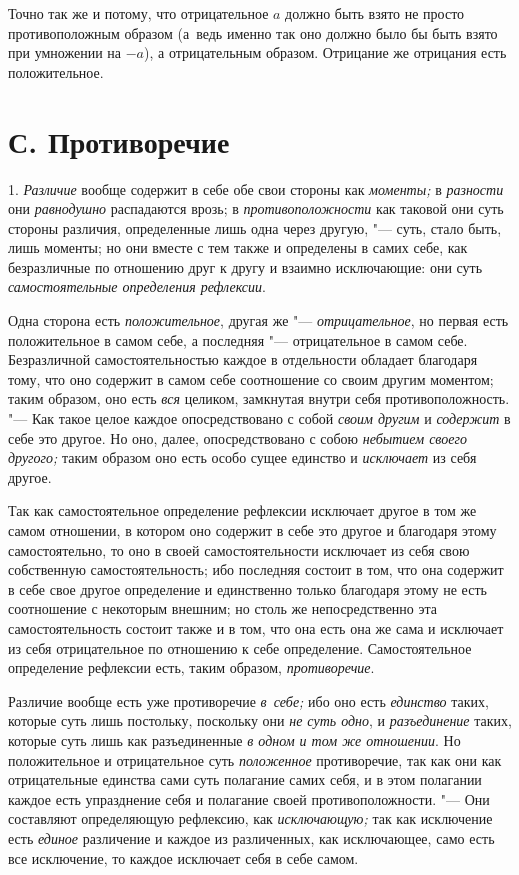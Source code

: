 Точно так же и потому, что отрицательное $a$ должно
быть взято не просто противоположным образом (а~ведь именно так оно должно
было бы быть взято при умножении на $-a$), а
отрицательным образом. Отрицание же отрицания есть положительное.

\section[С. Противоречие]{С. Противоречие}
1. {\em Различие} вообще содержит в себе обе свои стороны
как {\em моменты;} в {\em разности} они {\em равнодушно}
распадаются врозь; в {\em противоположности} как
таковой они суть стороны различия, определенные лишь одна через другую, "---
суть, стало быть, лишь моменты; но они вместе с тем также и определены в
самих себе, как безразличные по отношению друг к другу и взаимно
исключающие: они суть {\em самостоятельные определения рефлексии}.

Одна сторона есть {\em положительное}, другая же
"--- {\em отрицательное}, но первая есть положительное в
самом себе, а последняя "--- отрицательное в самом себе. Безразличной
самостоятельностью каждое в отдельности обладает благодаря тому, что оно
содержит в самом себе соотношение со своим другим моментом; таким образом,
оно есть {\em вся} целиком, замкнутая внутри себя
противоположность. "--- Как такое целое каждое опосредствовано с собой
{\em своим другим} и {\em содержит}
в себе это другое. Но оно, далее, опосредствовано с собою
{\em небытием своего другого;} таким образом оно есть
особо сущее единство и {\em исключает} из себя другое.

Так как самостоятельное определение рефлексии исключает другое в том же
самом отношении, в котором оно содержит в себе это другое и благодаря этому
самостоятельно, то оно в своей самостоятельности исключает из себя свою
собственную самостоятельность; ибо последняя состоит в том, что она
содержит в себе свое другое определение и единственно только благодаря
этому не есть соотношение с некоторым внешним; но столь же непосредственно
эта самостоятельность состоит также и в том, что она есть она же сама и
исключает из себя отрицательное по отношению к себе определение.
Самостоятельное определение рефлексии есть, таким образом, {\em противоречие}.

Различие вообще есть уже противоречие {\em в~себе;} ибо
оно есть {\em единство} таких, которые суть лишь
постольку, поскольку они {\em не суть одно}, и
{\em разъединение} таких, которые суть лишь как
разъединенные {\em в одном и том же отношении}. Но
положительное и отрицательное суть {\em положенное}
противоречие, так как они как отрицательные единства сами суть полагание
самих себя, и в этом полагании каждое есть упразднение себя и полагание
своей противоположности. "--- Они составляют определяющую рефлексию, как
{\em исключающую;} так как исключение есть
{\em единое} различение и каждое из различенных, как
исключающее, само есть все исключение, то каждое исключает себя в себе самом.

